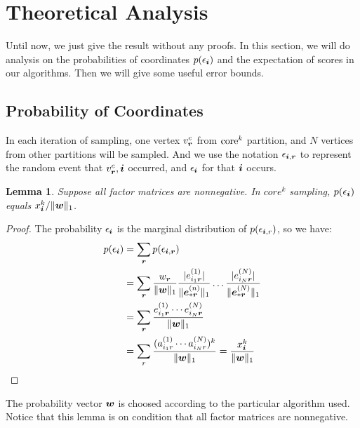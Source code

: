 \documentclass[letterpaper]{article}
\newcommand{\Sca}[3]{{#1}^{(#2)}_{i_#2#3}}%
\newcommand{\anr}[2]{\Sca{a}{#1}{#2}}
\newcommand{\V}[1]{{\bm{{\MakeLowercase{#1}}}}}
\newcommand{\VnC}[3]{\V{#1}^{(#2)}_{#3}}
\newcommand{\norm}[2]{\|#1\|_{#2}}
\newtheorem{lemma}{Lemma}
\begin{document}
\section{Theoretical Analysis}

Until now, we just give the result without any proofs.
In this section,
we will do analysis on the probabilities of coordinates $p(\epsilon_{\V{i}})$
and the expectation of scores in our algorithms.
Then we will give some useful error bounds.

\subsection{Probability of Coordinates}
In each iteration of sampling, one vertex $v^c_{\V{r}}$ from ${\rm core}^k$ partition,
and $N$ vertices from other partitions will be sampled.
And we use the notation $\epsilon_{\V{i},\V{r}}$ to represent the random event
that $v^c_{\V{r}},\V{i}$ occurred,
and $\epsilon_{\V{i}}$ for that $\V{i}$ occurs.

\begin{lemma}\label{lem:Probability}
    Suppose all factor matrices are nonnegative.
    In $core^k$ sampling, $p(\epsilon_{\V{i}})$ equals $x^k_{\V{i}}/\norm{\V{w}}{1}$.
\end{lemma}
\begin{proof}
The probability $\epsilon_{\V{i}}$ is the marginal distribution of $p(\epsilon_{\V{i},r})$,
so we have:
\begin{align*}
p(\epsilon_{\V{i}})
& = \sum_{\V{r}} p(\epsilon_{\V{i},\V{r}}) \\
& = \sum_{\V{r}} \frac{w_{\V{r}}}{\norm{\V{W}}{1}}
    \frac{|\Sca{e}{1}{\V{r}}|}{\norm{\VnC{e}{n}{*\V{r}}}{1}}\ldots\frac{|\Sca{e}{N}{\V{r}}|}{\norm{\VnC{e}{N}{*\V{r}}}{1}}\\
& = \sum_{\V{r}} \frac{\Sca{e}{1}{\V{r}}\cdots\Sca{e}{N}{\V{r}}}{\norm{\V{W}}{1}}\\
& = \sum_{r}\frac{(\anr{1}{r}\cdots\anr{N}{r})^k}{\norm{\V{W}}{1}}
  = \frac{x^k_{\V{i}}}{\norm{\V{w}}{1}}
\end{align*}
\end{proof}
The probability vector $\V{w}$ is choosed according to the particular algorithm used.
Notice that this lemma is on condition that all factor matrices are nonnegative.
\end{document}
